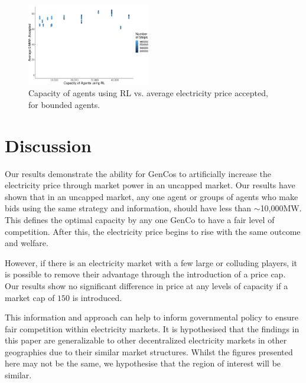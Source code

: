 \documentclass[conference]{IEEEtran}
\begin{document}
\begin{figure}
    \includegraphics[width=0.48\textwidth]{figures/results/bounded_results_scatter.pdf}
    \caption{Capacity of agents using RL vs. average electricity price accepted, for bounded agents.}
    \label{fig:bounded_results_scatter}
\end{figure}






\section{Discussion}
\label{sec:discussion}

Our results demonstrate the ability for GenCos to artificially increase the electricity price through market power in an uncapped market. Our results have shown that in an uncapped market, any one agent or groups of agents who make bids using the same strategy and information, should have less than ${\sim}$10,000MW. This defines the optimal capacity by any one GenCo to have a fair level of competition. After this, the electricity price begins to rise with the same outcome and welfare.

However, if there is an electricity market with a few large or colluding players, it is possible to remove their advantage through the introduction of a price cap. Our results show no significant difference in price at any levels of capacity if a market cap of \textsterling$150$ is introduced.

This information and approach can help to inform governmental policy to ensure fair competition within electricity markets. It is hypothesised that the findings in this paper are generalizable to other decentralized electricity markets in other geographies due to their similar market structures. Whilst the figures presented here may not be the same, we hypothesise that the region of interest will be similar.
\end{document}
